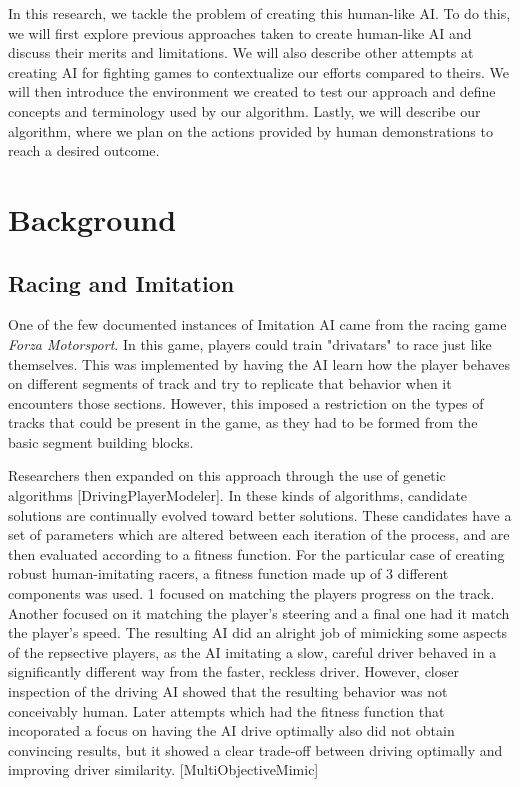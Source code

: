 \documentclass{article}
\begin{document}
In this research, we tackle the problem of creating this human-like AI. To do this, we will first explore previous approaches taken to create human-like AI and discuss their merits and limitations. We will also describe other attempts at creating AI for fighting games to contextualize our efforts compared to theirs. We will then introduce the environment we created to test our approach and define concepts and terminology used by our algorithm. Lastly, we will describe our algorithm, where we plan on the actions provided by human demonstrations to reach a desired outcome.









\section{Background}

\subsection{Racing and Imitation}
One of the few documented instances of Imitation AI came from the racing game \textit{Forza Motorsport}. In this game, players could train "drivatars" to race just like themselves. This was implemented by having the AI learn how the player behaves on different segments of track and try to replicate that behavior when it encounters those sections. However, this imposed a restriction on the types of tracks that could be present in the game, as they had to be formed from the basic segment building blocks.

Researchers then expanded on this approach through the use of genetic algorithms [DrivingPlayerModeler]. In these kinds of algorithms, candidate solutions are continually evolved toward better solutions. These candidates have a set of parameters which are altered between each iteration of the process, and are then evaluated according to a fitness function. For the particular case of creating robust human-imitating racers, a fitness function made up of 3 different components was used. 1 focused on matching the players progress on the track. Another focused on it matching the player's steering and a final one had it match the player's speed. The resulting AI did an alright job of mimicking some aspects of the repsective players, as the AI imitating a slow, careful driver behaved in a significantly different way from the faster, reckless driver. However, closer inspection of the driving AI showed that the resulting behavior was not conceivably human. Later attempts which had the fitness function that incoporated a focus on having the AI drive optimally also did not obtain convincing results, but it showed a clear trade-off between driving optimally and improving driver similarity. [MultiObjectiveMimic]
\end{document}
